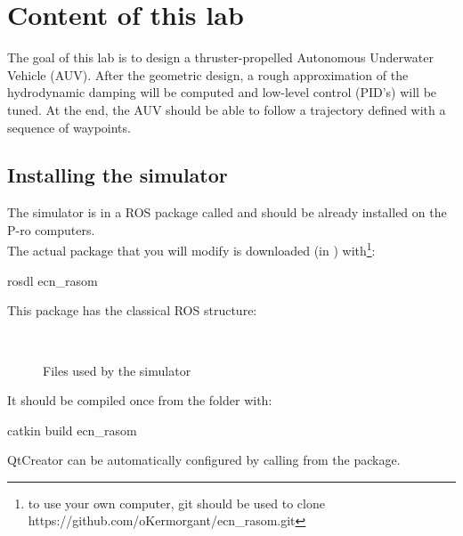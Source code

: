 \documentclass{ecnreport}
\begin{document}


\section{Content of this lab}

The goal of this lab is to design a thruster-propelled Autonomous Underwater Vehicle (AUV). After the geometric design, a rough approximation of the hydrodynamic damping will be computed
and low-level control (PID's) will be tuned. At the end, the AUV should be able to follow a trajectory defined with a sequence of waypoints.

\subsection{Installing the simulator}

The simulator is in a ROS package called  and should be already installed on the P-ro computers.\\
The actual package that you will modify is downloaded (in ) with\footnote{to use your own computer, git should be used to clone https://github.com/oKermorgant/ecn\_rasom.git}:
\begin{bashcodelarge}
rosdl ecn_rasom
\end{bashcodelarge}

This package has the classical ROS structure:
\begin{figure}[h]
\begin{minipage}{.25\linewidth} ~ \end{minipage}
\begin{minipage}{.5\linewidth}
\end{minipage}
\caption{Files used by the simulator}
\end{figure}

It should be compiled once from the  folder with:
\begin{bashcodelarge}
catkin build ecn_rasom
\end{bashcodelarge}
QtCreator can be automatically configured by calling  from the  package.
\end{document}
